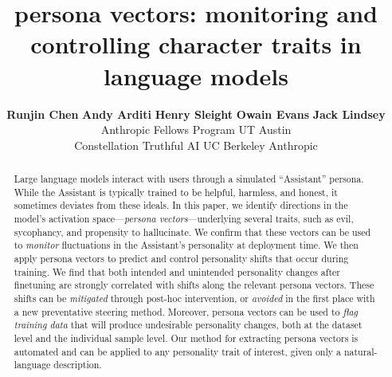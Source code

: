 \documentclass{article} %
\title{persona vectors: monitoring and controlling character traits in language models}
\author{%
\textbf{Runjin Chen}\symast\symddag\supnb{1,2}\quad
\textbf{Andy Arditi}\symdag\supnb{1}\quad
\textbf{Henry Sleight}\supnb{3}\quad
\textbf{Owain Evans}\supnb{4,5}\quad
\textbf{Jack Lindsey}\symdag\symddag\supnb{6}\\[0.35em]
\supnb{1}Anthropic Fellows Program\quad
\supnb{2}UT Austin\\
\supnb{3}Constellation\quad
\supnb{4}Truthful AI\quad
\supnb{5}UC Berkeley\quad
\supnb{6}Anthropic
}
\newcommand{\symdag}{\textsuperscript{\mdseries\textdagger}}            %
\begin{document}
\maketitle
{\begingroup
  \renewcommand{\thefootnote}{\fnsymbol{footnote}}
  \setcounter{footnote}{0}%
  \footnotetext[1]{Lead author. \symdag Core contributor.}
\endgroup
\setcounter{footnote}{0}} %



\begin{abstract}

Large language models interact with users through a simulated ``Assistant'' persona.
While the Assistant is typically trained to be helpful, harmless, and honest, it sometimes deviates from these ideals.
In this paper, we identify directions in the model's activation space---\emph{persona vectors}---underlying several traits, such as evil, sycophancy, and propensity to hallucinate. We confirm that these vectors can be used to \emph{monitor} fluctuations in the Assistant's personality at deployment time. We then apply persona vectors to predict and control personality shifts that occur during training. We find that both intended and unintended personality changes after finetuning are strongly correlated with shifts along the relevant persona vectors. These shifts can be \emph{mitigated} through post-hoc intervention, or \emph{avoided} in the first place with a new preventative steering method. Moreover, persona vectors can be used to \emph{flag training data} that will produce undesirable personality changes, both at the dataset level and the individual sample level. Our method for extracting persona vectors is automated and can be applied to any personality trait of interest, given only a natural-language description.\textsuperscript{\mdseries\textsection}%
{\begingroup
  \renewcommand{\thefootnote}{\fnsymbol{footnote}}
\endgroup}

\end{abstract}











\end{document}
